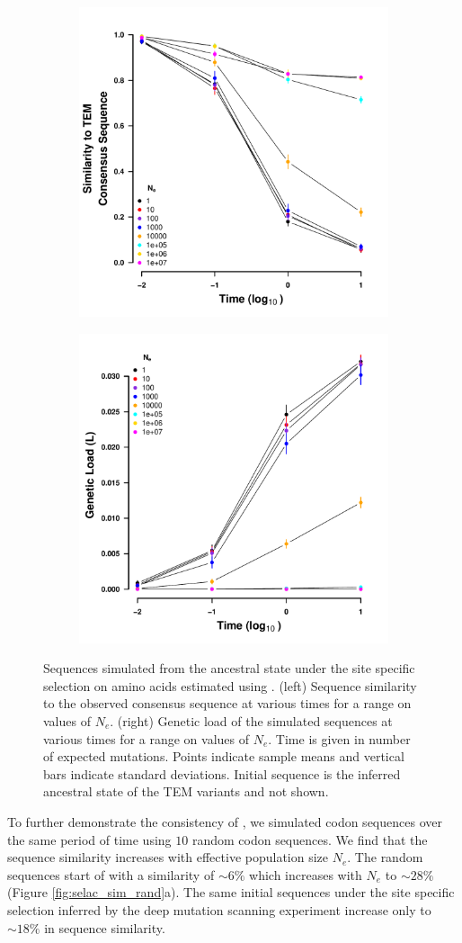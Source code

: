 \documentclass[12pt]{article}
\begin{document}
\begin{figure}[h]
    \centering
    \begin{subfigure}
        \centering
        \includegraphics[width=.45\textwidth]{img/simulated_dist_time_SELAC_ancest.pdf}
    \end{subfigure}
    \begin{subfigure}
        \centering
        \includegraphics[width=.45\textwidth]{img/simulated_gl_time_SELAC_ancest.pdf}
    \end{subfigure}
    \caption{Sequences simulated from the ancestral state under the site specific selection on amino acids estimated using \selac. 
    (left) Sequence similarity to the observed consensus sequence at various times for a range on values of $N_e$.
    (right) Genetic load of the simulated sequences at various times for a range on values of $N_e$.
    Time is given in number of expected mutations.
    Points indicate sample means and vertical bars indicate standard deviations. Initial sequence is the inferred ancestral state of the TEM variants and not shown.}
    \label{fig:selac_sim}
\end{figure}

To further demonstrate the consistency of \selac, we simulated codon sequences over the same period of time using $10$ random codon sequences.
We find that the sequence similarity increases with effective population size $N_e$.
The random sequences start of with a similarity of $\sim6 \%$ which increases with $N_e$ to $\sim28 \%$ (Figure \ref{fig:selac_sim_rand}a).
The same initial sequences under the site specific selection inferred by the deep mutation scanning experiment increase only to $\sim18 \%$ in sequence similarity.
\end{document}
